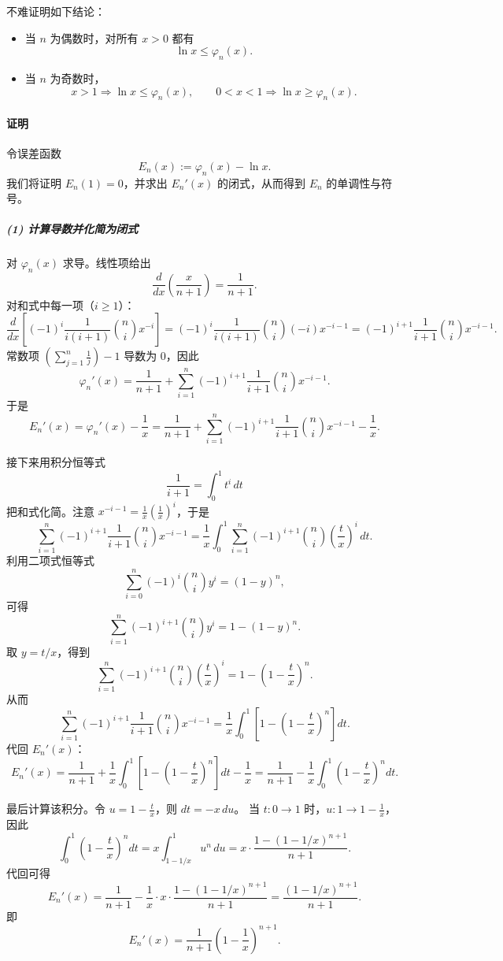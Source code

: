 \documentclass[12pt]{article}
\theoremstyle{definition}
\theoremstyle{plain}
\theoremstyle{definition}
\begin{document}
不难证明如下结论：

\begin{itemize}
\item 当 $n$ 为偶数时，对所有 $x>0$ 都有
\[
\ln x\le \varphi_n(x).
\]
\item 当 $n$ 为奇数时，
\[
x>1\Rightarrow \ln x\le \varphi_n(x),\qquad 0<x<1\Rightarrow \ln x\ge \varphi_n(x).
\]
\end{itemize}

\paragraph{证明}
令误差函数
\[
E_n(x):=\varphi_n(x)-\ln x.
\]
我们将证明 $E_n(1)=0$，并求出 $E_n'(x)$ 的闭式，从而得到 $E_n$ 的单调性与符号。

\subparagraph{(1) 计算导数并化简为闭式}
对 $\varphi_n(x)$ 求导。线性项给出
\[
\frac{d}{dx}\left(\frac{x}{n+1}\right)=\frac{1}{n+1}.
\]
对和式中每一项（$i\ge 1$）：
\[
\frac{d}{dx}\left[(-1)^i\frac{1}{i(i+1)}\binom{n}{i}x^{-i}\right]
=(-1)^i\frac{1}{i(i+1)}\binom{n}{i}(-i)x^{-i-1}
=(-1)^{i+1}\frac{1}{i+1}\binom{n}{i}x^{-i-1}.
\]
常数项 $\left(\sum_{j=1}^n\frac{1}{j}\right)-1$ 导数为 0，因此
\[
\varphi_n'(x)=\frac{1}{n+1}+\sum_{i=1}^{n}(-1)^{i+1}\frac{1}{i+1}\binom{n}{i}x^{-i-1}.
\]
于是
\[
E_n'(x)=\varphi_n'(x)-\frac{1}{x}
=\frac{1}{n+1}+\sum_{i=1}^{n}(-1)^{i+1}\frac{1}{i+1}\binom{n}{i}x^{-i-1}-\frac{1}{x}.
\]

接下来用积分恒等式
\[
\frac{1}{i+1}=\int_{0}^{1}t^{i}\,dt
\]
把和式化简。注意 $x^{-i-1}=\frac1x\left(\frac1x\right)^i$，于是
\[
\sum_{i=1}^{n}(-1)^{i+1}\frac{1}{i+1}\binom{n}{i}x^{-i-1}
=\frac{1}{x}\int_0^1\sum_{i=1}^{n}(-1)^{i+1}\binom{n}{i}\left(\frac{t}{x}\right)^i\,dt.
\]
利用二项式恒等式
\[
\sum_{i=0}^n(-1)^i\binom{n}{i}y^i=(1-y)^n,
\]
可得
\[
\sum_{i=1}^n(-1)^{i+1}\binom{n}{i}y^i
=1-(1-y)^n.
\]
取 $y=t/x$，得到
\[
\sum_{i=1}^{n}(-1)^{i+1}\binom{n}{i}\left(\frac{t}{x}\right)^i
=1-\left(1-\frac{t}{x}\right)^n.
\]
从而
\[
\sum_{i=1}^{n}(-1)^{i+1}\frac{1}{i+1}\binom{n}{i}x^{-i-1}
=\frac{1}{x}\int_0^1\left[1-\left(1-\frac{t}{x}\right)^n\right]dt.
\]
代回 $E_n'(x)$：
\[
E_n'(x)
=\frac{1}{n+1}+\frac{1}{x}\int_0^1\left[1-\left(1-\frac{t}{x}\right)^n\right]dt-\frac{1}{x}
=\frac{1}{n+1}-\frac{1}{x}\int_0^1\left(1-\frac{t}{x}\right)^n dt.
\]

最后计算该积分。令 $u=1-\frac{t}{x}$，则 $dt=-x\,du$。
当 $t:0\to 1$ 时，$u:1\to 1-\frac{1}{x}$，因此
\[
\int_0^1\left(1-\frac{t}{x}\right)^n dt
=x\int_{1-1/x}^{1}u^n\,du
=x\cdot\frac{1-(1-1/x)^{n+1}}{n+1}.
\]
代回可得
\[
E_n'(x)=\frac{1}{n+1}-\frac{1}{x}\cdot x\cdot\frac{1-(1-1/x)^{n+1}}{n+1}
=\frac{(1-1/x)^{n+1}}{n+1}.
\]
即
\[
\boxed{\;
E_n'(x)=\frac{1}{n+1}\left(1-\frac{1}{x}\right)^{n+1}.
\;}
\]
\end{document}
